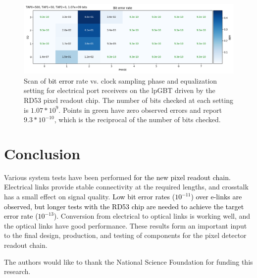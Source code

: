 \documentclass[a4paper,11pt]{article}
\newcommand{\gbps}{\ensuremath{\mathrm{Gb}/\mathrm{s}}\xspace}
\newcommand{\black}{\textcolor{black}}
\begin{document}
\begin{figure}[htbp]
\centering
\includegraphics[width=1.0\textwidth,origin=c]{../figures/lpGBT_bert.png}
\caption{
\label{fig:lpgbt_bert}
Scan of \black{bit error} rate vs. clock sampling phase and equalization setting for electrical port receivers on the lpGBT driven by the RD53 pixel readout chip.
The number of bits checked at each setting is $1.07 * 10^{9}$.
Points in green have zero observed errors and report $9.3 * 10^{-10}$, which is the reciprocal of the number of bits checked.
}
\end{figure}

\section{Conclusion}
\label{sec:conclusion}

Various system tests have been performed \black{for the new pixel readout chain.}
Electrical links provide stable connectivity at the required lengths, and crosstalk has a small effect on signal quality.
\black{Low bit error rates ($10^{-11}$) over e-links are observed, but longer tests with the RD53 chip are needed to achieve the target error rate ($10^{-13}$).}
Conversion from electrical to optical links is working well, and the optical links have good performance.
These results form an important input to the final design, production, and testing of components for the pixel detector readout chain.

\acknowledgments

The authors would like to thank the National Science Foundation for funding this research.




\end{document}
